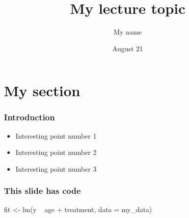\documentclass{beamer}
\author{My name}
\institute{University of Somewhere}
\title[My course]{My lecture topic}
\date{August 21}
\begin{document}
\begin{frame}
  \titlepage
\end{frame}

\section{My section}

\begin{frame}
  \frametitle{Introduction}
  \begin{itemize}
  \item <1-> Interesting point number 1
  \item <2-> Interesting point number 2
  \item <3-> Interesting point number 3
  \end{itemize}
\end{frame}

\begin{frame}[fragile]
  \frametitle{This slide has code}
  \begin{code}
    fit <- lm(y ~ age + treatment, data = my_data)
  \end{code}
\end{frame}
\end{document}
